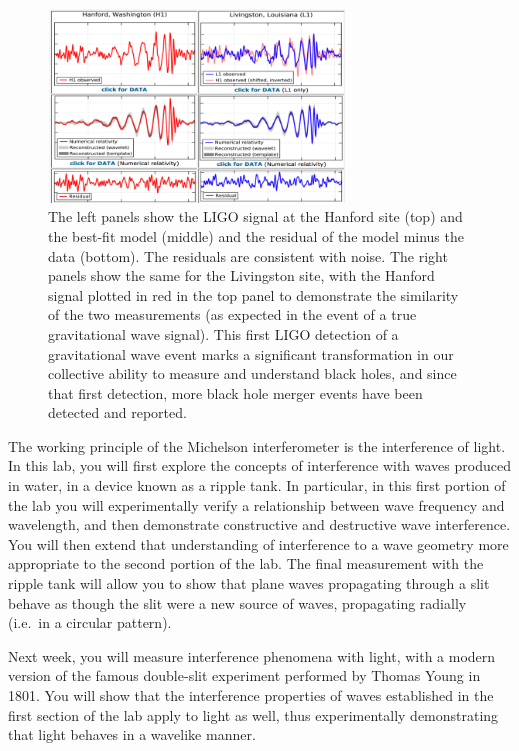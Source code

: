 \begin{figure}
	\centering
	\includegraphics[width=0.7\textwidth]{ripple-tank/ligo-signals.png}
	\caption{The left panels show the LIGO signal at the Hanford site (top) and the best-fit model
		(middle) and the residual of the model minus the data (bottom). The residuals are consistent
		with noise. The right panels show the same for the Livingston site, with the Hanford signal
		plotted in red in the top panel to demonstrate the similarity of the two measurements (as
		expected in the event of a true gravitational wave signal). This first LIGO detection of a
		gravitational wave event marks a significant transformation in our collective ability to
		measure and understand black holes, and since that first detection, more black hole merger
		events have been detected and reported.}\label{rt:fig:ligo-signals}
\end{figure}

The working principle of the Michelson interferometer is the interference of light.
In this lab, you will first explore the concepts of interference with waves produced in water, in a device known as a ripple tank.
In particular, in this first portion of the lab you will experimentally verify a relationship between wave frequency and wavelength, and then demonstrate constructive and destructive wave interference.
You will then extend that understanding of interference to a wave geometry more appropriate to the second portion of the lab.
The final measurement with the ripple tank will allow you to show that plane waves propagating through a slit behave as though the slit were a new source of waves, propagating radially (i.e.\ in a circular pattern).

Next week, you will measure interference phenomena with light, with a modern version of the famous double-slit experiment performed by Thomas Young in 1801.
You will show that the interference properties of waves established in the first section of the lab apply to light as well, thus experimentally demonstrating that light behaves in a wavelike manner.

